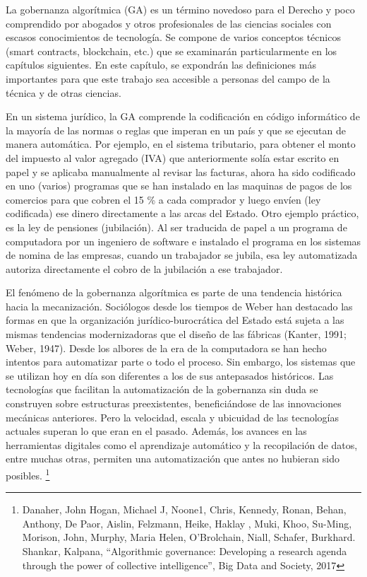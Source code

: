 \documentclass[12pt]{report} %
\begin{document}
La gobernanza algorítmica (GA) es un término novedoso para el Derecho y poco comprendido por abogados y otros profesionales de las ciencias sociales con escasos conocimientos de tecnología. Se compone de varios conceptos técnicos (smart contracts, blockchain, etc.) que se examinarán particularmente en los capítulos siguientes. En este capítulo, se expondrán las definiciones más importantes para que este trabajo sea accesible a personas del campo de la técnica y de otras ciencias.

En un sistema jurídico, la GA comprende la codificación en código informático de la mayoría de las normas o reglas que imperan en un país y que se ejecutan de manera automática. Por ejemplo, en el sistema tributario, para obtener el monto del impuesto al valor agregado (IVA) que anteriormente solía estar escrito en papel y se aplicaba manualmente al revisar las facturas, ahora ha sido codificado en uno (varios) programas que se han instalado en las maquinas de pagos de los comercios para que cobren el 15 \% a cada comprador y luego envíen (ley codificada) ese dinero directamente a las arcas del Estado. Otro ejemplo práctico, es la ley de pensiones (jubilación). Al ser traducida de papel a un programa de computadora por un ingeniero de software e instalado el programa en los sistemas de nomina de las empresas, cuando un trabajador se jubila, esa ley automatizada autoriza directamente el cobro de la jubilación a ese trabajador.

El fenómeno de la gobernanza algorítmica es parte de una tendencia histórica hacia la mecanización. Sociólogos desde los tiempos de Weber han destacado las formas en que la organización jurídico-burocrática del Estado está sujeta a las mismas tendencias modernizadoras que el diseño de las fábricas (Kanter, 1991; Weber, 1947). Desde los albores de la era de la computadora se han hecho intentos para automatizar parte o todo el proceso. Sin embargo, los sistemas que se utilizan hoy en día son diferentes a los de sus antepasados históricos. Las tecnologías que facilitan la automatización de la gobernanza sin duda se construyen sobre estructuras preexistentes, beneficiándose de las innovaciones mecánicas anteriores. Pero la velocidad, escala y ubicuidad de las tecnologías actuales superan lo que eran en el pasado. Además, los avances en las herramientas digitales como el aprendizaje automático y la recopilación de datos, entre muchas otras, permiten una automatización que antes no hubieran sido posibles. \footnote{Danaher, John Hogan, Michael J, Noone1, Chris, Kennedy, Ronan, Behan, Anthony, De Paor, Aislin,
Felzmann, Heike, Haklay , Muki, Khoo, Su-Ming, Morison, John, Murphy, Maria Helen, O’Brolchain, Niall, Schafer, Burkhard. Shankar, Kalpana, “Algorithmic governance: Developing a research agenda through the power of collective intelligence”, Big Data and Society, 2017
}
\end{document}
